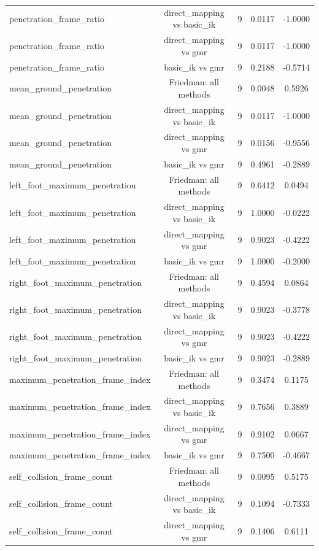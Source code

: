 \begin{table}[t]
{\begin{tabular}{lcccc}
penetration\_frame\_ratio & direct\_mapping vs basic\_ik & 9 & 0.0117 & -1.0000 \\
penetration\_frame\_ratio & direct\_mapping vs gmr & 9 & 0.0117 & -1.0000 \\
penetration\_frame\_ratio & basic\_ik vs gmr & 9 & 0.2188 & -0.5714 \\
mean\_ground\_penetration & Friedman: all methods & 9 & 0.0048 & 0.5926 \\
mean\_ground\_penetration & direct\_mapping vs basic\_ik & 9 & 0.0117 & -1.0000 \\
mean\_ground\_penetration & direct\_mapping vs gmr & 9 & 0.0156 & -0.9556 \\
mean\_ground\_penetration & basic\_ik vs gmr & 9 & 0.4961 & -0.2889 \\
left\_foot\_maximum\_penetration & Friedman: all methods & 9 & 0.6412 & 0.0494 \\
left\_foot\_maximum\_penetration & direct\_mapping vs basic\_ik & 9 & 1.0000 & -0.0222 \\
left\_foot\_maximum\_penetration & direct\_mapping vs gmr & 9 & 0.9023 & -0.4222 \\
left\_foot\_maximum\_penetration & basic\_ik vs gmr & 9 & 1.0000 & -0.2000 \\
right\_foot\_maximum\_penetration & Friedman: all methods & 9 & 0.4594 & 0.0864 \\
right\_foot\_maximum\_penetration & direct\_mapping vs basic\_ik & 9 & 0.9023 & -0.3778 \\
right\_foot\_maximum\_penetration & direct\_mapping vs gmr & 9 & 0.9023 & -0.4222 \\
right\_foot\_maximum\_penetration & basic\_ik vs gmr & 9 & 0.9023 & -0.2889 \\
maximum\_penetration\_frame\_index & Friedman: all methods & 9 & 0.3474 & 0.1175 \\
maximum\_penetration\_frame\_index & direct\_mapping vs basic\_ik & 9 & 0.7656 & 0.3889 \\
maximum\_penetration\_frame\_index & direct\_mapping vs gmr & 9 & 0.9102 & 0.0667 \\
maximum\_penetration\_frame\_index & basic\_ik vs gmr & 9 & 0.7500 & -0.4667 \\
self\_collision\_frame\_count & Friedman: all methods & 9 & 0.0095 & 0.5175 \\
self\_collision\_frame\_count & direct\_mapping vs basic\_ik & 9 & 0.1094 & -0.7333 \\
self\_collision\_frame\_count & direct\_mapping vs gmr & 9 & 0.1406 & 0.6111 \\

\end{tabular}}
\end{table}

